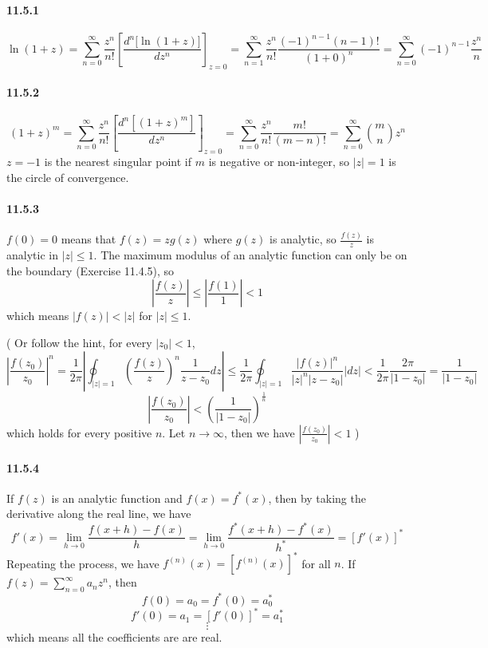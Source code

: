 \documentclass[a4paper]{article}
\begin{document}
\paragraph{11.5.1}
\[
\ln(1+z)=\sum_{n=0}^\infty\frac{z^n}{n!}\left[\frac{d^n\big[\ln(1+z)\big]}{dz^n}\right]_{z=0}=\sum_{n=1}^\infty\frac{z^n}{n!}\frac{(-1)^{n-1}(n-1)!}{(1+0)^n}=\sum_{n=0}^\infty(-1)^{n-1}\frac{z^n}{n}
\]

\paragraph{11.5.2}
\[
(1+z)^m=\sum_{n=0}^\infty\frac{z^n}{n!}\left[\frac{d^n\left[(1+z)^m\right]}{dz^n} \right]_{z=0}=\sum_{n=0}^\infty\frac{z^n}{n!}\frac{m!}{(m-n)!}=\sum_{n=0}^\infty\binom{m}{n}z^n
\]
$z=-1$ is the nearest singular point if $m$ is negative or non-integer, so $|z|=1$ is the circle of convergence.
 
\paragraph{11.5.3}
$f(0)=0$ means that $f(z)=zg(z)$ where $g(z)$ is analytic, so $\frac{f(z)}{z}$ is analytic in $|z|\leq1$. The maximum modulus of an analytic function can only be on the boundary (Exercise 11.4.5), so 
\[
\left|\frac{f(z)}{z}\right|\leq\left|\frac{f(1)}{1}\right|<1
\]
which means $|f(z)|<|z|$ for $|z|\leq1$.
\medskip

(
Or follow the hint, for every $|z_0|<1$,
\[
\left|\frac{f(z_0)}{z_0}\right|^n=\frac{1}{2\pi}\left|\oint_{|z|=1}\left(\frac{f(z)}{z} \right)^n\frac{1}{z-z_0}dz \right|\leq\frac{1}{2\pi}\oint_{|z|=1}\frac{|f(z)|^n}{|z|^n|z-z_0|}|dz|<\frac{1}{2\pi}\frac{2\pi}{|1-z_0|}=\frac{1}{|1-z_0|}
\]
\[
\left|\frac{f(z_0)}{z_0}\right|<\left(\frac{1}{|1-z_0|}\right)^{\frac{1}{n}}
\]
which holds for every positive $n$. Let $n\to\infty$, then we have $\left|\frac{f(z_0)}{z_0}\right|<1$ )
    
\paragraph{11.5.4}
If $f(z)$ is an analytic function and $f(x)=f^*(x)$, then by taking the derivative along the real line, we have
\[
f'(x)=\lim_{h\to0}\frac{f(x+h)-f(x)}{h}=\lim_{h\to0}\frac{f^*(x+h)-f^*(x)}{h^*}=\left[f'(x)\right]^*
\]
Repeating the process, we have $f^{(n)}(x)=\left[f^{(n)}(x)\right]^*$ for all $n$. If $f(z)=\sum_{n=0}^\infty a_nz^n$, then
\[
f(0)=a_0=f^*(0)=a_0^*
\]
\[
f'(0)=a_1=\left[f'(0)\right]^*=a_1^*
\]
\[
\vdots
\]
which means all the coefficients are are real.
\medskip
\end{document}
